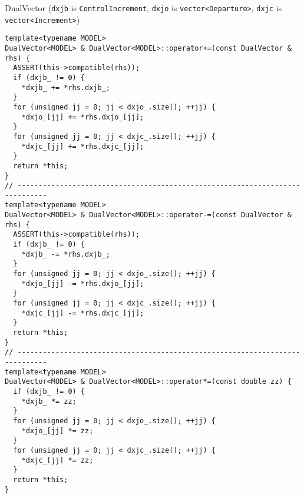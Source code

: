 \documentclass[9pt]{beamer}
\begin{document}
\begin{frame}[fragile]{DualVector (\lstinline|dxjb| is \lstinline|ControlIncrement|, \lstinline|dxjo| is \lstinline|vector<Departure>|, \lstinline|dxjc| is \lstinline|vector<Increment>|)}
  \begin{lstlisting}[basicstyle=\ttfamily\tiny]
template<typename MODEL>
DualVector<MODEL> & DualVector<MODEL>::operator+=(const DualVector & rhs) {
  ASSERT(this->compatible(rhs));
  if (dxjb_ != 0) {
    *dxjb_ += *rhs.dxjb_;
  }
  for (unsigned jj = 0; jj < dxjo_.size(); ++jj) {
    *dxjo_[jj] += *rhs.dxjo_[jj];
  }
  for (unsigned jj = 0; jj < dxjc_.size(); ++jj) {
    *dxjc_[jj] += *rhs.dxjc_[jj];
  }
  return *this;
}
// -----------------------------------------------------------------------------
template<typename MODEL>
DualVector<MODEL> & DualVector<MODEL>::operator-=(const DualVector & rhs) {
  ASSERT(this->compatible(rhs));
  if (dxjb_ != 0) {
    *dxjb_ -= *rhs.dxjb_;
  }
  for (unsigned jj = 0; jj < dxjo_.size(); ++jj) {
    *dxjo_[jj] -= *rhs.dxjo_[jj];
  }
  for (unsigned jj = 0; jj < dxjc_.size(); ++jj) {
    *dxjc_[jj] -= *rhs.dxjc_[jj];
  }
  return *this;
}
// -----------------------------------------------------------------------------
template<typename MODEL>
DualVector<MODEL> & DualVector<MODEL>::operator*=(const double zz) {
  if (dxjb_ != 0) {
    *dxjb_ *= zz;
  }
  for (unsigned jj = 0; jj < dxjo_.size(); ++jj) {
    *dxjo_[jj] *= zz;
  }
  for (unsigned jj = 0; jj < dxjc_.size(); ++jj) {
    *dxjc_[jj] *= zz;
  }
  return *this;
}
\end{lstlisting}
\end{frame}
\end{document}
